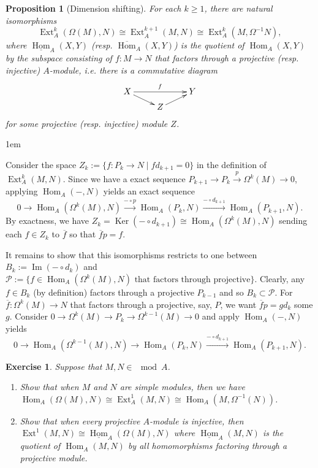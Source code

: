 \documentclass[11pt,a4paper]{article}
\makeatletter
\numberwithin{equation}{section}
\renewenvironment{proof}[1][\proofname]{\par
    \pushQED{\qed}%
    \normalfont \topsep0\p@\@plus6\p@ \labelsep1em\relax
    \trivlist
    \item[\hskip\labelsep\indent
        \bfseries #1]\ignorespaces
    \mbox{}
}{
    \popQED\endtrivlist\@endpefalse
}
\theoremstyle{all}
\newtheorem{proposition}[theorem]{Proposition}
\newtheorem{exercise}[theorem]{Exercise}
\theoremstyle{remark}
\newcommand{\Ext}{\operatorname{Ext}\nolimits}
\newcommand{\Hom}{\operatorname{Hom}\nolimits}
\renewcommand{\Im}{\operatorname{Im}\nolimits}
\newcommand{\Ker}{\operatorname{Ker}\nolimits}
\makeatother
\begin{document}
\begin{proposition}[Dimension shifting]
For each $k\geq 1$, there are natural isomorphisms 
\[\Ext_A^{k}(\Omega(M),N) \cong \Ext_A^{k+1}(M,N)\cong \Ext_A^k(M,\Omega^{-1}N),
\]
where $\underline{\Hom}_A(X,Y)$ (resp. $\overline{\Hom}_A(X,Y)$) is the quotient of $\Hom_A(X,Y)$ by the subspace consisting of $f:M\to N$ that factors through a projective (resp. injective) $A$-module, i.e. there is a commutative diagram
\[
\xymatrix@R=5pt{X \ar[rr]^{f}\ar[rd] & & Y\\ & Z\ar[ru] & }
\]
for some projective (resp. injective) module $Z$.
\end{proposition}
\begin{proof}
Consider the space $Z_k:=\{f:P_k\to N\mid fd_{k+1}=0\}$ in the definition of $\Ext_A^k(M,N)$.
Since we have a exact sequence $P_{k+1} \to P_k\xrightarrow{p} \Omega^k(M)\to 0$, applying $\Hom_A(-,N)$ yields an exact sequence
\[
0\to \Hom_A(\Omega^k(M), N)\xrightarrow{-\circ p} \Hom_A(P_k,N) \xrightarrow{-\circ d_{k+1}} \Hom_A(P_{k+1},N).
\]
By exactness, we have $Z_k=\Ker(-\circ d_{k+1})\cong \Hom_A(\Omega^k(M),N)$ sending each $f\in Z_k$ to $\overline{f}$ so that $\overline{f}p=f$.

It remains to show that this isomorphisms restricts to one between $B_k:=\Im(-\circ d_k)$ and $\mathcal{P}:=\{f\in\Hom_A(\Omega^k(M),N)\text{ that factors through projective}\}$.
Clearly, any $f\in B_k$ (by definition) factors through a projective $P_{k-1}$ and so $B_k\subset \mathcal{P}$.
For $\overline{f}:\Omega^k(M)\to N$ that factors through a projective, say, $P$, we want $\overline{f}p = gd_k$ some $g$.
Consider $0\to \Omega^k(M) \to P_{k} \to \Omega^{k-1}(M)\to 0$ and apply $\Hom_A(-,N)$ yields
\[
0\to \Hom_A(\Omega^{k-1}(M), N)\xrightarrow{} \Hom_A(P_k,N) \xrightarrow{-\circ d_{k+1}} \Hom_A(P_{k+1},N).
\]
\end{proof}

\begin{exercise}
Suppose that $M,N\in \mod A$.
\begin{enumerate}
\item Show that when $M$ and $N$ are simple modules, then we have $\Hom_A(\Omega(M),N)\cong \Ext_A^1(M,N)\cong \Hom_A(M,\Omega^{-1}(N))$.

\item Show that when every projective $A$-module is injective, then $\Ext^1(M,N)\cong \underline{\Hom}_A(\Omega(M),N)$ where $\underline{\Hom}_A(M,N)$ is the quotient of $\Hom_A(M,N)$ by all homomorphisms factoring through a projective module.
\end{enumerate}
\end{exercise}
\end{document}
